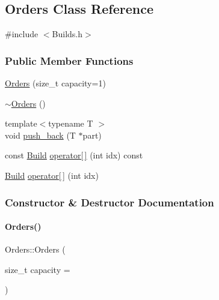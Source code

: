 \subsection{Orders Class Reference}
\label{class_orders}


{\ttfamily \#include $<$Builds.\+h$>$}

\subsubsection*{Public Member Functions}
\begin{DoxyCompactItemize}
\item 
\mbox{\hyperlink{class_orders_aa52a641a269671bbf68637e0771e8b5d}{Orders}} (size\+\_\+t capacity=1)
\item 
\mbox{\hyperlink{class_orders_a12bcbd0cd430b51f65f651fddad3f662}{$\sim$\+Orders}} ()
\item 
{\footnotesize template$<$typename T $>$ }\\void \mbox{\hyperlink{class_orders_a678969b0e57fd41f4ab0cc949d4500f6}{push\+\_\+back}} (T $\ast$part)
\item 
const \mbox{\hyperlink{class_build}{Build}} \mbox{\hyperlink{class_orders_a9574f4521c39b8a8d7cdfd1f28b07ffb}{operator\mbox{[}$\,$\mbox{]}}} (int idx) const
\item 
\mbox{\hyperlink{class_build}{Build}} \mbox{\hyperlink{class_orders_abae5fb4a0e7dfa2c222215850531d695}{operator\mbox{[}$\,$\mbox{]}}} (int idx)
\end{DoxyCompactItemize}


\subsubsection{Constructor \& Destructor Documentation}
\mbox{\label{class_orders_aa52a641a269671bbf68637e0771e8b5d}} 
\paragraph{\texorpdfstring{Orders()}{Orders()}}
{\footnotesize\ttfamily Orders\+::\+Orders (\begin{DoxyParamCaption}\item[{size\+\_\+t}]{capacity = {} }\end{DoxyParamCaption})\hspace{0.3cm}{\ttfamily [inline]}}

\mbox{\label{class_orders_a12bcbd0cd430b51f65f651fddad3f662}} 
